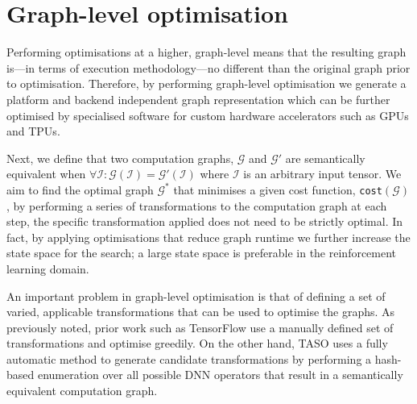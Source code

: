 \section{Graph-level optimisation}

Performing optimisations at a higher, graph-level means that the resulting graph is---in terms of execution methodology---no different than the original graph prior to optimisation. Therefore, by performing graph-level optimisation we generate a platform and backend independent graph representation which can be further optimised by specialised software for custom hardware accelerators such as GPUs and TPUs.

Next, we define that two computation graphs, $\mathcal{G}$ and $\mathcal{G}'$ are semantically equivalent when $\forall \mathcal{I} : \mathcal{G}(\mathcal{I}) = \mathcal{G}'(\mathcal{I})$ where $\mathcal{I}$ is an arbitrary input tensor. We aim to find the optimal graph $\mathcal{G}^*$ that minimises a given cost function, \texttt{cost}$(\mathcal{G})$, by performing a series of transformations to the computation graph at each step, the specific transformation applied does not need to be strictly optimal. In fact, by applying optimisations that reduce graph runtime we further increase the state space for the search; a large state space is preferable in the reinforcement learning domain.

An important problem in graph-level optimisation is that of defining a set of varied, applicable transformations that can be used to optimise the graphs. As previously noted, prior work such as TensorFlow use a manually defined set of transformations and optimise greedily. On the other hand, TASO uses a fully automatic method to generate candidate transformations by performing a hash-based enumeration over all possible DNN operators that result in a semantically equivalent computation graph.

